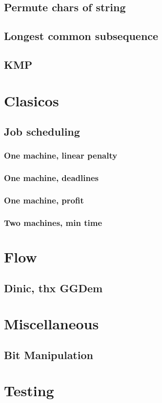 \subsection{Permute chars of string}
\subsection{Longest common subsequence}
\subsection{KMP}
\section{Clasicos}
\subsection{Job scheduling}
\subsubsection{One machine, linear penalty}
\subsubsection{One machine, deadlines}
\subsubsection{One machine, profit}
\subsubsection{Two machines, min time}

\section{Flow}
\subsection{Dinic, thx GGDem}

\section{Miscellaneous}

\subsection{Bit Manipulation}

\section{Testing}





